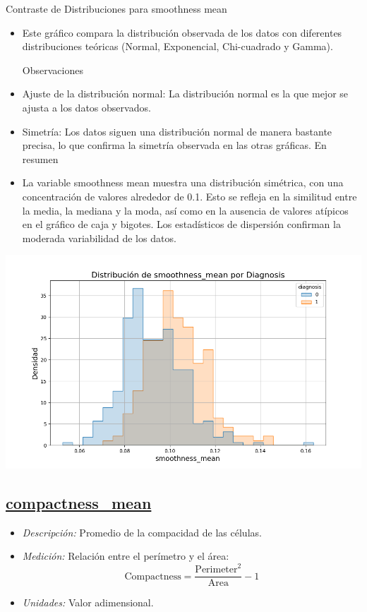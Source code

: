 \documentclass[a4paper, 12pt]{article}
\begin{document}
Contraste de Distribuciones para smoothness mean
\begin{itemize}
\item Este gráfico compara la distribución observada de los datos con diferentes distribuciones teóricas (Normal, Exponencial, Chi-cuadrado y Gamma).

Observaciones

\item Ajuste de la distribución normal: La distribución normal es la que mejor se ajusta a los datos observados.
\item Simetría: Los datos siguen una distribución normal de manera bastante precisa, lo que confirma la simetría observada en las otras gráficas.
En resumen
\item La variable smoothness mean muestra una distribución simétrica, con una concentración de valores alrededor de 0.1. Esto se refleja en la similitud entre la media, la mediana y la moda, así como en la ausencia de valores atípicos en el gráfico de caja y bigotes. Los estadísticos de dispersión confirman la moderada variabilidad de los datos.
\end{itemize}


\includegraphics[width=\textwidth]{../Plots/plots_diagnosis/distribucion_smoothness_mean_por_diagnosis.png}

\subsection*{\underline{compactness\_mean}}
  \begin{itemize}
	\item \textit{Descripción:} Promedio de la compacidad de las células.
	\item \textit{Medición:} Relación entre el perímetro y el área:
	\[
	\text{Compactness} = \frac{\text{Perimeter}^2}{\text{Area}} - 1
	\]
	\item \textit{Unidades:} Valor adimensional.
\end{itemize}
\end{document}
